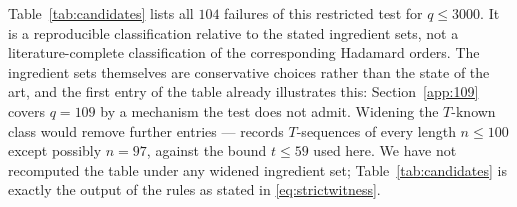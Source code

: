 \documentclass[11pt]{article}
\begin{document}
Table~\ref{tab:candidates} lists all \(104\) failures of this restricted
test for \(q\le3000\).  It is a reproducible classification relative to
the stated ingredient sets, not a literature-complete classification of
the corresponding Hadamard orders.  The ingredient sets themselves are
conservative choices rather than the state of the art, and the first
entry of the table already illustrates this: Section~\ref{app:109} covers
\(q=109\) by a mechanism the test does not admit.  Widening the
\(T\)-known class would remove further entries --- \cite[Sec.~2]{Djokovic2011}
records \(T\)-sequences of every length \(n\le100\) except possibly
\(n=97\), against the bound \(t\le59\) used here.  We have not
recomputed the table under any widened ingredient set;
Table~\ref{tab:candidates} is exactly the output of the rules as stated
in \eqref{eq:strictwitness}.
\end{document}
